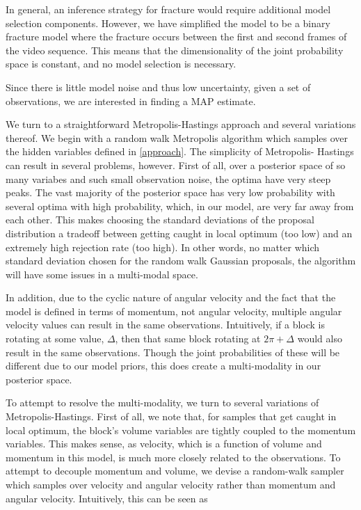 \documentclass[runningheads]{llncs}
\begin{document}
In general, an inference strategy for fracture would require additional model 
selection components. However, we have simplified the model to be a binary 
fracture model where the fracture occurs between the first and second frames of 
the video sequence. This means that the dimensionality of the joint probability 
space is constant, and no model selection is necessary.

Since there is little model noise and thus low uncertainty, given a set of 
observations, we are interested in finding a MAP estimate.

We turn to a straightforward Metropolis-Hastings approach and several variations 
thereof. We begin with a random walk Metropolis algorithm which samples over 
the hidden variables defined in \ref{approach}. The simplicity of Metropolis-
Hastings can result in several problems, however. First of all, over a posterior 
space of so many variabes and such small observation noise, the optima have very 
steep peaks. The vast majority of the posterior space has very low probability 
with several optima with high probability, which, in our model, are very far 
away from each other. 
This makes choosing the standard 
deviations of the proposal distribution a tradeoff between getting caught in local 
optimum (too low) and an extremely high rejection rate (too high). In other 
words, no matter which standard deviation chosen for the random walk Gaussian 
proposals, the algorithm will have some issues in a multi-modal space.

In addition, due to the cyclic 
nature of angular velocity and the fact that the model is defined in terms of 
momentum, not angular velocity, multiple angular velocity values can result 
in the same observations. Intuitively, if a block is rotating at some value, 
$\Delta$, then that same block rotating at $2\pi + \Delta$ would also result in 
the same observations. Though the joint probabilities of these will be different 
due to our model priors, this does create a multi-modality in our posterior 
space.

To attempt to resolve the multi-modality, we turn to several variations of 
Metropolis-Hastings. First of all, we note that, for samples that get caught in 
local optimum, the block's volume variables are tightly coupled to the momentum 
variables. This makes sense, as velocity, which is a function of volume and 
momentum in this model, is much more closely related to the observations. To 
attempt to decouple momentum and volume, we devise a random-walk sampler which 
samples over velocity and angular velocity rather than momentum and angular 
velocity. Intuitively, this can be seen as 
\end{document}
